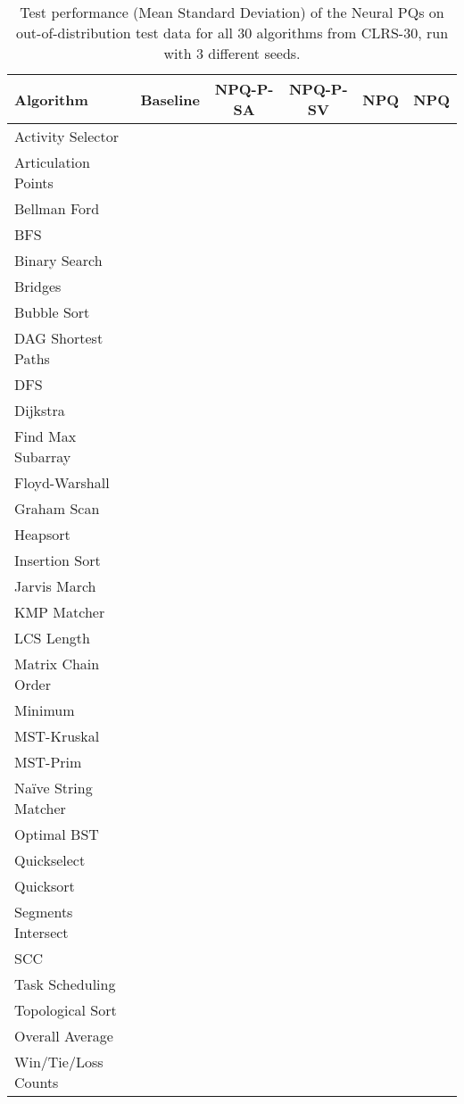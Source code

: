 \documentclass{article}
\theoremstyle{plain}
\theoremstyle{definition}
\theoremstyle{remark}
\begin{document}
\setlength{\tabcolsep}{4pt}
\begin{table}[tbhp]
\begin{adjustwidth}{-2cm}{-2cm}
\centering
\captionsetup{margin=2cm}
\small
\begin{tabular}{lccccc}
    \hline
    \bfseries Algorithm & \bfseries Baseline & \bfseries NPQ-P-SA & \bfseries NPQ-P-SV & \bfseries NPQ & \bfseries NPQ \\
    \hline
    Activity Selector &  &  &  &  &  \\
    Articulation Points &  &  &  &  &  \\
    Bellman Ford &  &  &  &  &  \\
    BFS &  &  &  &  &  \\
    Binary Search &  &  &  &  &  \\
    Bridges &  &  &  &  &  \\
    Bubble Sort &  &  &  &  &  \\
    DAG Shortest Paths &  &  &  &  &  \\
    DFS &  &  &  &  &  \\
    Dijkstra &  &  &  &  &  \\
    Find Max Subarray &  &  &  &  &  \\
    Floyd-Warshall &  &  &  &  &  \\
    Graham Scan &  &  &  &  &  \\
    Heapsort &  &  &  &  &  \\
    Insertion Sort &  &  &  &  &  \\
    Jarvis March &  &  &  &  &  \\
    KMP Matcher &  &  &  &  &  \\
    LCS Length &  &  &  &  &  \\
    Matrix Chain Order &  &  &  &  &  \\
    Minimum &  &  &  &  &  \\
    MST-Kruskal &  &  &  &  &  \\
    MST-Prim &  &  &  &  &  \\
    Na{\"i}ve String Matcher &  &  &  &  &  \\
    Optimal BST &  &  &  &  &  \\
    Quickselect &  &  &  &  &  \\
    Quicksort &  &  &  &  &  \\
    Segments Intersect &  &  &  &  &  \\
    SCC &  &  &  &  &  \\
    Task Scheduling &  &  &  &  &  \\
    Topological Sort &  &  &  &  &  \\
    \hline
    Overall Average &  &  &  &  &  \\    
    Win/Tie/Loss Counts &  &  &  &  &  \\
    \hline
\end{tabular}
\caption[Evaluation results with MPNN base on all 30 algorithms from CLRS-30 benchmark.]{Test performance (Mean  Standard Deviation) of the
         Neural PQs on out-of-distribution test data for all 30 algorithms from CLRS-30,
         run with 3 different seeds.}
\label{table:all-algs-best-large}
\end{adjustwidth}
\end{table}
\end{document}
